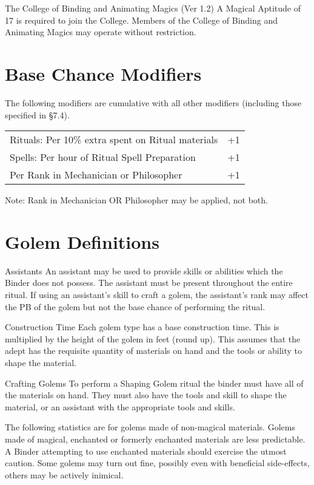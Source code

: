 \begin{Chapter}{The College of Binding and Animating Magics (Ver 1.2)}
A Magical Aptitude of 17 is required to join the College.  Members of
the College of Binding and Animating Magics may operate without
restriction.

\section{Base Chance Modifiers}

The following modifiers are cumulative with all other modifiers
(including those specified in §7.4).

\begin{tabularx}{\columnwidth}{Xr}
Rituals: Per 10\% extra spent on Ritual materials	& +1 \\
Spells: Per hour of Ritual Spell Preparation		& +1 \\
Per Rank in Mechanician or Philosopher			& +1 \\
\end{tabularx}

Note: Rank in Mechanician OR Philosopher may be applied, not both.


\section{Golem Definitions}

\begin{Description}
\item[Assistants] An assistant may be used to provide skills or
  abilities which the Binder does not possess.  The assistant must be
  present throughout the entire ritual.  If using an assistant’s skill
  to craft a golem, the assistant’s rank may affect the PB of the
  golem but not the base chance of performing the ritual.

\item[Construction Time] Each golem type has a base construction time.
  This is multiplied by the height of the golem in feet (round
  up). This assumes that the adept has the requisite quantity of
  materials on hand and the tools or ability to shape the material.

\item[Crafting Golems] To perform a Shaping Golem ritual the binder
  must have all of the materials on hand.  They must also have the
  tools and skill to shape the material, or an assistant with the
  appropriate tools and skills.

 The following statistics are for golems made
of non-magical materials.  Golems made of magical, enchanted or
formerly enchanted materials are less predictable. A Binder attempting
to use enchanted materials should exercise the utmost caution.  Some
golems may turn out fine, possibly even with beneficial side-effects,
others may be actively inimical.


\end{Description}
\end{Chapter}
